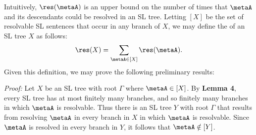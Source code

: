 Intuitively, $\res(\metaA)$ is an upper bound on the number of times that $\metaA$ and its descendants could be resolved in an SL tree. 
%
%
Letting $[X]$ be the set of resolvable SL sentences that occur in any branch of $X$, we may define the  of an SL tree $X$ as follows: 
  $$\res(X)=\sum\limits_{\metaA\in [X]}\res(\metaA).$$
Given this definition, we may prove the following preliminary results:

\label{ResolutionTreeLemma}

\textit{Proof:}
Let $X$ be an SL tree with root $\Gamma$ where $\metaA\in[X]$.
By \textbf{Lemma 4}, every SL tree has at most finitely many branches, and so finitely many branches in which $\metaA$ is resolvable. 
Thus there is an SL tree $Y$ with root $\Gamma$ that results from resolving $\metaA$ in every branch in $X$ in which $\metaA$ is resolvable.
Since $\metaA$ is resolved in every branch in $Y$, it follows that $\metaA\notin[Y]$.

